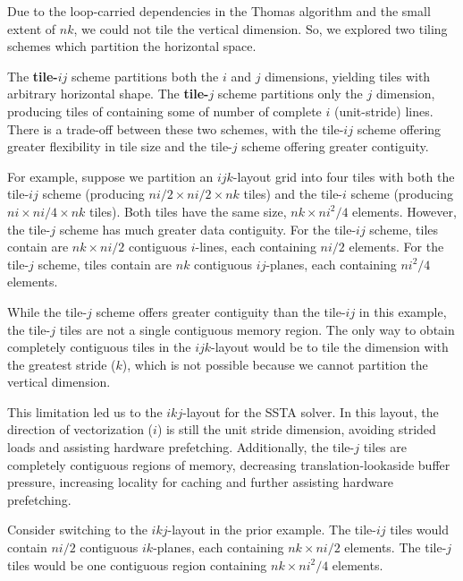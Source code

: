 \documentclass{sig-alternate-05-2015}
\begin{document}

Due to the loop-carried dependencies in the Thomas algorithm and the small
  extent of \(nk\), we could not tile the vertical dimension. So, we explored two
  tiling schemes which partition the horizontal space.

The \textbf{tile-\(ij\)} scheme partitions both the \(i\) and \(j\) dimensions,
  yielding tiles with arbitrary horizontal shape. 
The \textbf{tile-\(j\)} scheme partitions only the \(j\) dimension, producing
  tiles of containing some of number of complete \(i\) (unit-stride) lines.
There is a trade-off between these two schemes, with the tile-\(ij\) scheme
  offering greater flexibility in tile size and the tile-\(j\) scheme offering
  greater contiguity. 

For example, suppose we partition an \(ijk\)-layout grid into four tiles with
  both the tile-\(ij\) scheme (producing \(ni/2 \times ni/2 \times nk\) tiles)
  and the tile-\(i\) scheme (producing \(ni \times ni/4 \times nk\) tiles).
Both tiles have the same size, \(nk \times ni^2/4\) elements.
However, the tile-\(j\) scheme has much greater data contiguity.
For the tile-\(ij\) scheme, tiles contain are \(nk \times ni/2\) contiguous
  \(i\)-lines, each containing \(ni/2\) elements.
For the tile-\(j\) scheme, tiles contain are \(nk\) contiguous \(ij\)-planes,
  each containing \(ni^2/4\) elements.

While the tile-\(j\) scheme offers greater contiguity than the
  tile-\(ij\) in this example, the tile-\(j\) tiles are not a single contiguous
  memory region.
The only way to obtain completely contiguous tiles in the \(ijk\)-layout would
  be to tile the dimension with the greatest stride (\(k\)), which is not possible
  because we cannot partition the vertical dimension.

This limitation led us to the \(ikj\)-layout for the SSTA solver.
In this layout, the direction of vectorization (\(i\)) is still the unit stride
  dimension, avoiding strided loads and assisting hardware prefetching.
Additionally, the tile-\(j\) tiles are completely contiguous regions of memory,
  decreasing translation-lookaside buffer pressure, increasing locality for
  caching and further assisting hardware prefetching.

Consider switching to the \(ikj\)-layout in the prior example.
The tile-\(ij\) tiles would contain \(ni/2\) contiguous \(ik\)-planes, each
  containing \(nk \times ni/2\) elements.
The tile-\(j\) tiles would be one contiguous region containing
  \(nk \times ni^2/4\) elements.
\end{document}
